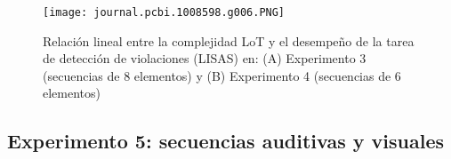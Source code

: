 \begin{figure}[t!]
      \texttt{[image: journal.pcbi.1008598.g006.PNG]}
      \centering
      \caption{Relación lineal entre la complejidad LoT y el desempeño de la tarea de detección de violaciones (LISAS) en: (A) Experimento 3 (secuencias de 8 elementos) y (B) Experimento 4 (secuencias de 6 elementos)}
      \label{PlosBIO-F6}
\end{figure}

\subsection{Experimento 5: secuencias auditivas y visuales}


